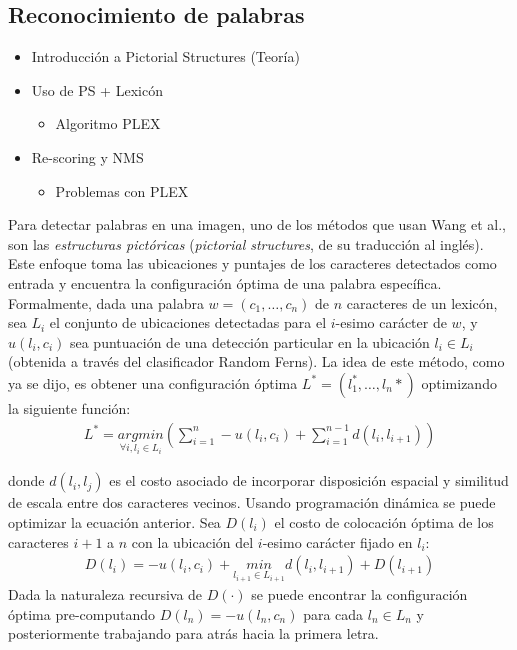 \subsection{Reconocimiento de palabras}
	\begin{itemize}
		\item Introducción a Pictorial Structures (Teoría)
		\item Uso de PS + Lexicón
		\begin{itemize}
			\item Algoritmo PLEX
		\end{itemize}
		\item Re-scoring y NMS
		\begin{itemize}
			\item Problemas con PLEX
		\end{itemize}
	\end{itemize}
	
	Para detectar palabras en una imagen, uno de los métodos que usan Wang et al., son las \textit{estructuras pictóricas} (\textit{pictorial structures}, de su traducción al inglés). Este enfoque toma las ubicaciones y puntajes de los caracteres detectados como entrada y encuentra la configuración óptima de una palabra específica. Formalmente, dada una palabra $w=(c_1,\dots , c_n)$ de $n$ caracteres de un lexicón, sea $L_i$ el conjunto de ubicaciones detectadas para el $i$-esimo carácter de $w$, y $u(l_i, c_i)$ sea puntuación de una detección particular en la ubicación $l_i \in L_i$ (obtenida a través del clasificador Random Ferns). La idea de este método, como ya se dijo, es obtener una configuración óptima $L^{*}=(l_1^{*}, \dots, l_n{*})$ optimizando la siguiente función:
	\begin{align}
		L^{*} = \underset{\forall i, l_i\in L_i}{argmin}\left( \sum_{i=1}^n -u(l_i, c_i) + \sum_{i=1}^{n-1} d(l_i,l_{i+1}) \right)
	\end{align}		
	
	donde $d(l_i, l_j)$ es el costo asociado de incorporar disposición espacial y similitud de escala entre dos caracteres vecinos. Usando programación dinámica se puede optimizar la ecuación anterior. Sea $D(l_i)$ el costo de colocación óptima de los caracteres $i+1$ a $n$ con la ubicación del $i$-esimo carácter fijado en $l_i$:
	\begin{align}
		D(l_i) = -u(l_i,c_i) + \underset{l_{i+1}\in L_{i+1}}{min} d(l_i,l_{i+1}) + D(l_{i+1})
	\end{align}
	Dada la naturaleza recursiva de $D(\cdot)$ se puede encontrar la configuración óptima pre-computando $D(l_n) = -u(l_n,c_n)$ para cada $l_n \in L_n$ y posteriormente trabajando para atrás hacia la primera letra.
	
